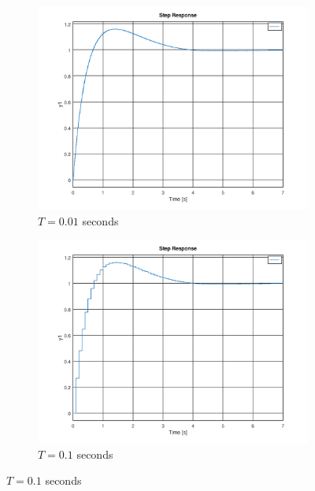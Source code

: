\documentclass[a4paper, 12pt]{article}
\begin{document}
\begin{figure}[H]
  \centering
  \begin{subfigure}{.6\textwidth}
    \includegraphics[width=\textwidth]{./img/2_5_mpz001.png}
    \caption{$T = 0.01$ seconds}
    \label{fig:mpz001}
  \end{subfigure}

  \begin{subfigure}{.6\textwidth}
    \includegraphics[width=\textwidth]{./img/2_5_mpz01.png}
    \caption{$T = 0.1$ seconds}
    \label{fig:mpz01}
  \end{subfigure}
  

\end{figure}
\end{document}
